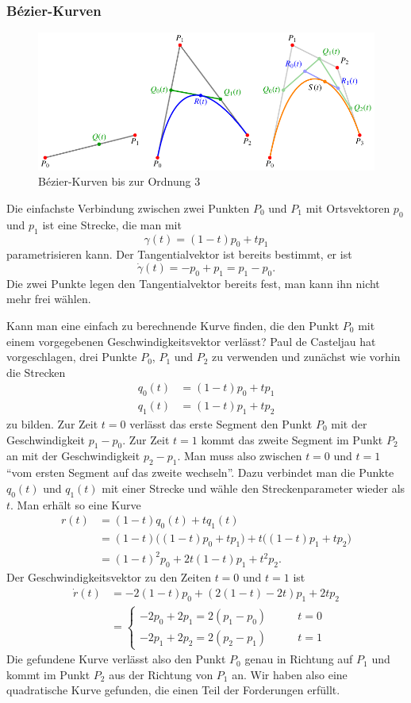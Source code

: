 \subsubsection{Bézier-Kurven}
\begin{figure}
\centering
\includegraphics{chapters/30-interpolation/figures/bezier.pdf}
\caption{Bézier-Kurven bis zur Ordnung 3
\label{buch:interpolation:figure:bezier}}
\end{figure}
Die einfachste Verbindung zwischen zwei Punkten $P_0$ und $P_1$ mit
Ortsvektoren $p_0$ und $p_1$ ist eine Strecke, die man mit
\[
\gamma(t) = (1-t)p_0 + tp_1
\]
parametrisieren kann.
Der Tangentialvektor ist bereits bestimmt, er ist
\[
\dot{\gamma}(t) = -p_0 + p_1 = p_1-p_0.
\]
Die zwei Punkte legen den Tangentialvektor bereits fest, man kann
ihn nicht mehr frei wählen.

Kann man eine einfach zu berechnende Kurve finden, die den Punkt $P_0$
mit einem vorgegebenen Geschwindigkeitsvektor verlässt?
Paul de Casteljau hat vorgeschlagen, drei Punkte $P_0$, $P_1$ und $P_2$
zu verwenden und zunächst wie vorhin die Strecken 
\begin{align*}
q_0(t) &= (1-t) p_0 + t p_1 \\
q_1(t) &= (1-t) p_1 + t p_2 
\end{align*}
zu bilden.
Zur Zeit $t=0$ verlässt das erste Segment den Punkt $P_0$ mit der
Geschwindigkeit $p_1-p_0$.
Zur Zeit $t=1$ kommt das zweite Segment im Punkt $P_2$ an mit der
Geschwindigkeit $p_2-p_1$.
Man muss also zwischen $t=0$ und $t=1$ ``vom ersten Segment auf das zweite
wechseln''.
Dazu verbindet man die Punkte $q_0(t)$ und $q_1(t)$ mit einer Strecke und
wähle den Streckenparameter wieder als $t$.
Man erhält so eine Kurve
\begin{align*}
r(t)
&=
(1-t) q_0(t) + t q_1(t)
\\
&=
(1-t) \bigl( (1-t)p_0 + tp_1\bigr)
+
t \bigl( (1-t)p_1 + tp_2\bigr)
\\
&=
(1-t)^2 p_0 + 2t(1-t) p_1 + t^2 p_2.
\end{align*}
Der Geschwindigkeitsvektor zu den Zeiten $t=0$ und $t=1$ ist
\begin{align*}
\dot{r}(t)
&=
-2(1-t)p_0 + (2(1-t)-2t) p_1 + 2tp_2
\\
&=\begin{cases}
-2p_0+2p_1=2(p_1-p_0)&\qquad t=0
\\
-2p_1+2p_2=2(p_2-p_1)&\qquad t=1
\end{cases}
\end{align*}
Die gefundene Kurve verlässt also den Punkt $P_0$ genau in Richtung
auf $P_1$ und kommt im Punkt $P_2$ aus der Richtung von $P_1$ an.
Wir haben also eine quadratische Kurve gefunden, die einen Teil 
der Forderungen erfüllt.

